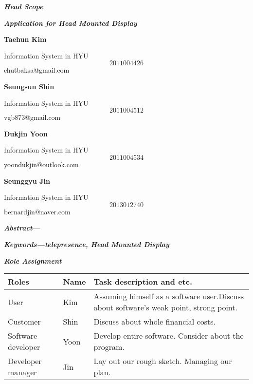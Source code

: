 \documentclass{article}
\begin{document}

\noindent 

\noindent 

\noindent 

\noindent 

\noindent \textbf{\textit{Head Scope}}

\noindent \textbf{\textit{Application for Head Mounted Display }}

\noindent 

\noindent \textbf{Taehun Kim}

\noindent Information System in HYU
\[2011004426\] 
chutbaksa@gmail.com

\noindent 

\noindent \textbf{Seungsun Shin}

\noindent Information System in HYU
\[2011004512\] 
vgb873@gmail.com

\noindent \textbf{Dukjin Yoon}

\noindent Information System in HYU
\[2011004534\] 
yoondukjin@outlook.com

\noindent 

\noindent \textbf{Seunggyu Jin}

\noindent Information System in HYU
\[2013012740\] 
bernardjin@naver.com

\noindent 

\textbf{\textit{Abstract}---\textit{}}

\textbf{\textit{Keywords---telepresence, Head Mounted Display}}

\textbf{\textit{Role Assignment}}

\begin{tabular}{|p{0.4in}|p{0.4in}|p{1.5in}|} \hline 
\textbf{Roles\textit{}} & \textbf{Name} & \textbf{Task description and etc.} \\ \hline 
User & Kim &  Assuming himself as a software user.\newline Discuss about software's weak point, strong point.  \\ \hline 
Customer & Shin &  Discuss about whole financial costs.  \\ \hline 
Software developer & Yoon &  Develop entire software. Consider about the program. \\ \hline 
Developer manager & Jin &  Lay out our rough sketch. Managing our plan. \\ \hline 
\end{tabular}
\end{document}
